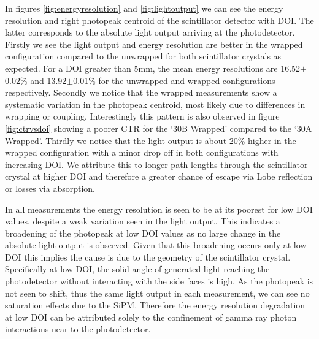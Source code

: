 In figures \ref{fig:energyresolution} and \ref{fig:lightoutput} we can see the energy resolution and right photopeak centroid of the scintillator detector with DOI. The latter corresponds to the absolute light output arriving at the photodetector. Firstly we see the light output and energy resolution are better in the wrapped configuration compared to the unwrapped for both scintillator crystals as expected. For a DOI greater than 5mm, the mean energy resolutions are 16.52$\pm$0.02\% and 13.92$\pm$0.01\% for the unwrapped and wrapped configurations respectively. Secondly we notice that the wrapped measurements show a systematic variation in the photopeak centroid, most likely due to differences in wrapping or coupling. Interestingly this pattern is also observed in figure \ref{fig:ctrvsdoi} showing a poorer CTR for the `30B Wrapped' compared to the `30A Wrapped'. Thirdly we notice that the light output is about 20\% higher in the wrapped configuration with a minor drop off in both configurations with increasing DOI. We attribute this to longer path lengths through the scintillator crystal at higher DOI and therefore a greater chance of escape via Lobe reflection\cite{Janecek_Moses_2010} or losses via absorption.

In all measurements the energy resolution is seen to be at its poorest for low DOI values, despite a weak variation seen in the light output. This indicates a broadening of the photopeak at low DOI values as no large change in the absolute light output is observed. Given that this broadening occurs only at low DOI this implies the cause is due to the geometry of the scintillator crystal. Specifically at low DOI, the solid angle of generated light reaching the photodetector without interacting with the side faces is high. As the photopeak is not seen to shift, thus the same light output in each measurement, we can see no saturation effects due to the SiPM. Therefore
the energy resolution degradation at low DOI can be attributed solely to the confinement of gamma ray photon interactions near to the photodetector.